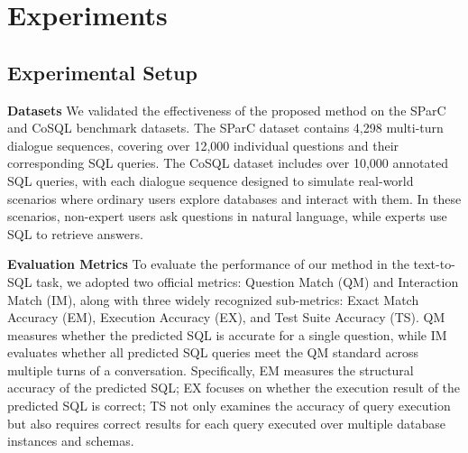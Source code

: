 \documentclass[11pt]{article}
\begin{document}
\section{Experiments}

\subsection{Experimental Setup}

\noindent\textbf{Datasets}
We validated the effectiveness of the proposed method on the SParC \cite{yu-etal-2019-sparc} and CoSQL \cite{yu-etal-2019-cosql} benchmark datasets. The SParC dataset contains 4,298 multi-turn dialogue sequences, covering over 12,000 individual questions and their corresponding SQL queries. The CoSQL dataset includes over 10,000 annotated SQL queries, with each dialogue sequence designed to simulate real-world scenarios where ordinary users explore databases and interact with them. In these scenarios, non-expert users ask questions in natural language, while experts use SQL to retrieve answers. 

\vspace{4pt}
\noindent\textbf{Evaluation Metrics}
To evaluate the performance of our method in the text-to-SQL task, we adopted two official metrics: Question Match (QM) and Interaction Match (IM), along with three widely recognized sub-metrics: Exact Match Accuracy (EM), Execution Accuracy (EX), and Test Suite Accuracy (TS). QM measures whether the predicted SQL is accurate for a single question, while IM evaluates whether all predicted SQL queries meet the QM standard across multiple turns of a conversation. Specifically, EM measures the structural accuracy of the predicted SQL; EX focuses on whether the execution result of the predicted SQL is correct; TS not only examines the accuracy of query execution but also requires correct results for each query executed over multiple database instances and schemas. 
\end{document}
